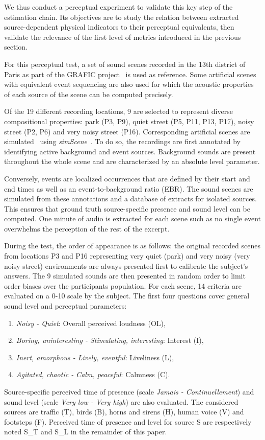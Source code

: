 \documentclass{article}
\begin{document}
\begin{sloppy}
We thus conduct a perceptual experiment to validate this key step of the estimation chain. Its objectives are to study the relation between extracted source-dependent physical indicators to their perceptual equivalents, then validate the relevance of the first level of metrics introduced in the previous section.

For this perceptual test, a set of sound scenes recorded in the 13th district of Paris as part of the GRAFIC project~\cite{aumond2017} is used as reference. Some artificial scenes with equivalent event sequencing are also used for which the acoustic properties of each source of the scene can be computed precisely.

Of the 19 different recording locations, 9 are selected to represent diverse compositional properties: park (P3, P9), quiet street (P5, P11, P13, P17), noisy street (P2, P6) and very noisy street (P16). Corresponding artificial scenes are simulated~\cite{gloaguen2017} using \textit{simScene}~\cite{rossignol2015}. To do so, the recordings are first annotated by identifying active background and event sources. Background sounds are present throughout the whole scene and are characterized by an absolute level parameter.

Conversely, events are localized occurrences that are defined by their start and end times as well as an event-to-background ratio (EBR). The sound scenes are simulated from these annotations and a database of extracts for isolated sources. This ensures that ground truth source-specific presence and sound level can be computed. One minute of audio is extracted for each scene such as no single event overwhelms the perception of the rest of the excerpt.

During the test, the order of appearance is as follows: the original recorded scenes from locations P3 and P16 representing very quiet (park) and very noisy (very noisy street) environments are always presented first to calibrate the subject's answers. The 9 simulated sounds are then presented in random order to limit order biases over the participants population. For each scene, 14 criteria are evaluated on a 0-10 scale by the subject. The first four questions cover general sound level and perceptual parameters:
\begin{enumerate}
\item \textit{Noisy - Quiet}: Overall perceived loudness (OL),
\item \textit{Boring, uninteresting - Stimulating, interesting}: Interest (I),
\item \textit{Inert, amorphous - Lively, eventful}: Liveliness (L),
\item \textit{Agitated, chaotic - Calm, peaceful}: Calmness (C).
\end{enumerate}
Source-specific perceived time of presence (scale \textit{Jamais - Continuellement}) and sound level (scale \textit{Very low - Very high}) are also evaluated. The considered sources are traffic (T), birds (B), horns and sirens (H), human voice (V) and footsteps (F). Perceived time of presence and level for source S are respectively noted S\_T and S\_L in the remainder of this paper.


\end{sloppy}
\end{document}
